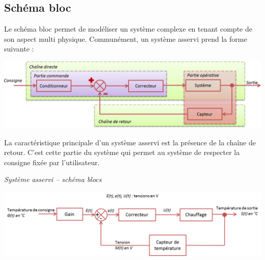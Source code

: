 \documentclass[10pt,fleqn]{article} %
\begin{document}
\subsection{Schéma bloc}
Le schéma bloc permet de modéliser un système complexe en tenant compte de son aspect multi physique. Communément, un système asservi prend la forme suivante : 

\begin{center}
    \includegraphics[width=\textwidth]{images/schbloc}
\end{center}


La caractéristique principale d'un système asservi est la présence de la chaîne de retour. C'est cette partie du système qui permet au système de respecter la consigne fixée par l'utilisateur.

\begin{exemple}
\textit{Système asservi -- schéma blocs}
\begin{center}
    \includegraphics[width=\textwidth]{images/chauffage}
\end{center}
\end{exemple}

\newpage 
\end{document}

